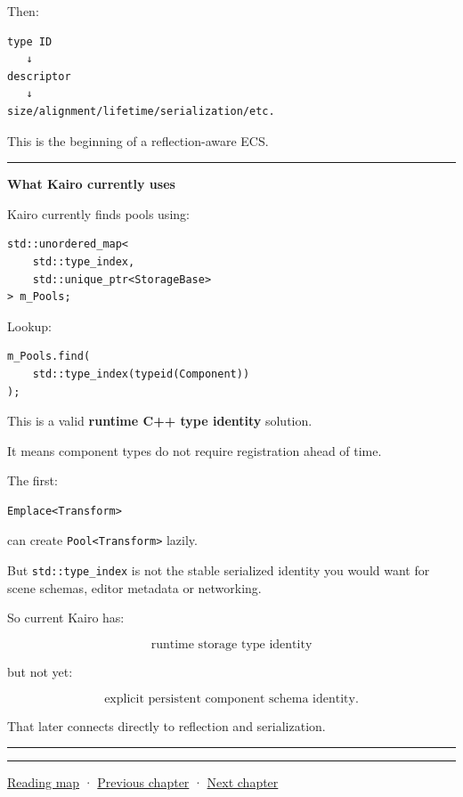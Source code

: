 Then:

\begin{verbatim}
type ID
   ↓
descriptor
   ↓
size/alignment/lifetime/serialization/etc.
\end{verbatim}

This is the beginning of a reflection-aware ECS.

\begin{center}\rule{0.5\linewidth}{0.5pt}\end{center}

\textbf{What Kairo currently uses}

Kairo currently finds pools using:

\begin{verbatim}
std::unordered_map<
    std::type_index,
    std::unique_ptr<StorageBase>
> m_Pools;
\end{verbatim}

Lookup:

\begin{verbatim}
m_Pools.find(
    std::type_index(typeid(Component))
);
\end{verbatim}

This is a valid \textbf{runtime C++ type identity} solution.

It means component types do not require registration ahead of time.

The first:

\begin{verbatim}
Emplace<Transform>
\end{verbatim}

can create \texttt{Pool\textless{}Transform\textgreater{}} lazily.

But \texttt{std::type\_index} is not the stable serialized identity you would want for scene schemas, editor metadata or networking.

So current Kairo has:

\[
\boxed{
\text{runtime storage type identity}
}
\]

but not yet:

\[
\boxed{
\text{explicit persistent component schema identity}.
}
\]

That later connects directly to reflection and serialization.

\begin{center}\rule{0.5\linewidth}{0.5pt}\end{center}

\begin{center}\rule{0.5\linewidth}{0.5pt}\end{center}

\hyperref[volume-reading-map]{Reading map} · \hyperref[05-engine-i-ch013]{Previous chapter} · \hyperref[05-engine-i-ch015]{Next chapter}
